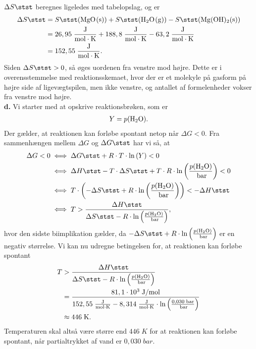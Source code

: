 \documentclass{report}
\begin{document}
$\Delta S \stst $ beregnes ligeledes med tabelopslag, og er
\begin{equation*}
\begin{split}
  \Delta S \stst &=S \stst (\ce{MgO(s)}) + S \stst (\ce{H2O(g)})-S \stst (\ce{Mg(OH)2(s)})\\
  &=26,95 \;\unit{\frac{J}{mol \cdot K}} + 188,8 \;\unit{\frac{J}{mol \cdot K}} -63,2 \;\unit{\frac{J}{mol \cdot K}}\\
  &=152,55 \;\unit{\frac{J}{mol \cdot K}}.
\end{split}
\end{equation*}
Siden $\Delta S \stst >0$, så øges uordenen fra venstre mod højre.
Dette er i overensstemmelse med reaktionsskemaet, hvor der er et molekyle på gasform på højre side af ligevægtspilen, men ikke venstre, og antallet af formelenheder vokser fra venstre mod højre.\\[1ex]
\textbf{d.}
Vi starter med at opskrive reaktionsbrøken, som er
\begin{equation*}
\begin{split}
  Y=p(\ce{H2O}).
\end{split}
\end{equation*}
Der gælder, at reaktionen kan forløbe spontant netop når $\Delta G <0$.
Fra sammenhængen mellem $\Delta G$ og $\Delta G \stst $ har vi så, at 
\begin{equation*}
\begin{split}
  \Delta G < 0 &\iff \Delta G \stst + R \cdot T \cdot \ln\left(Y\right) <0\\
  &\iff \Delta H \stst -T \cdot \Delta S \stst + T \cdot R \cdot \ln\left(\frac{p(\ce{H2O})}{\;\unit{bar} }\right) <0 \\
  &\iff T \cdot \left(-\Delta S \stst + R \cdot \ln\left(\frac{p(\ce{H2O} )}{\;\unit{bar} }\right) \right) < -\Delta H \stst \\
  &\iff T > \frac{\Delta H \stst }{\Delta S \stst -R \cdot \ln\left(\frac{p(\ce{H2O} )}{\;\unit{bar} }\right) },
\end{split}
\end{equation*}
hvor den sidste biimplikation gælder, da $-\Delta S \stst + R \cdot \ln\left(\frac{p(\ce{H2O} )}{\;\unit{bar} }\right)$ er en negativ størrelse. 
Vi kan nu udregne betingelsen for, at reaktionen kan forløbe spontant
\begin{equation*}
\begin{split}
  T &> \frac{\Delta H \stst }{\Delta S \stst -R \cdot \ln\left(\frac{p(\ce{H2O} )}{\;\unit{bar} }\right) }\\
  &=\frac{81,1 \cdot 10^3 \;\unit{J/mol} }{152,55 \;\unit{\frac{J}{mol \cdot K}} -8,314 \;\unit{\frac{J}{mol \cdot K}} \cdot \ln\left(\frac{0,030 \;\unit{bar} }{\;\unit{bar} }\right) }\\
  &\approx 446 \;\unit{K}.
\end{split}
\end{equation*}
Temperaturen skal altså være større end $446 \;\unit{K} $ for at reaktionen kan forløbe spontant, når partialtrykket af vand er $0,030 \;\unit{bar} $. 
\end{document}

